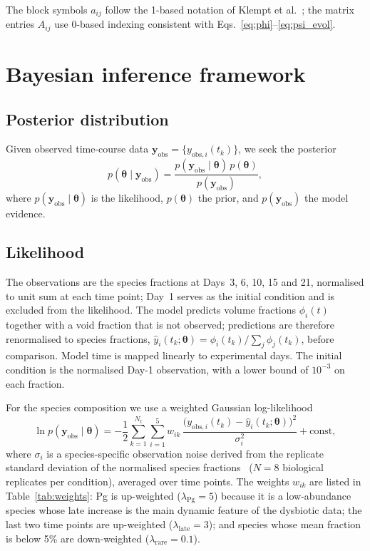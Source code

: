 \documentclass[pdflatex,sn-mathphys-num,lineno]{sn-jnl}
\newcommand{\btheta}{\boldsymbol{\theta}}
\newcommand{\yobs}{\mathbf{y}_{\mathrm{obs}}}
\begin{document}
The block symbols $a_{ij}$ follow the 1-based notation of Klempt et al.~\cite{Klempt2025ContinuumBiofilm}; the matrix entries $A_{ij}$ use 0-based indexing consistent with Eqs.~\eqref{eq:phi}--\eqref{eq:psi_evol}.

\section{Bayesian inference framework}
\label{sec:bayes}

\subsection{Posterior distribution}

Given observed time-course data $\yobs = \{y_{\mathrm{obs},i}(t_k)\}$, we seek the posterior
\begin{equation}
p(\btheta\mid\yobs)
= \frac{p(\yobs\mid\btheta)\,p(\btheta)}{p(\yobs)},
\label{eq:bayes}
\end{equation}
where $p(\yobs\mid\btheta)$ is the likelihood, $p(\btheta)$ the prior, and $p(\yobs)$ the model evidence.

\subsection{Likelihood}
\label{sec:likelihood}

The observations are the species fractions at Days~3, 6, 10, 15 and 21, normalised to unit sum at each time point; Day~1 serves as the initial condition and is excluded from the likelihood.
The model predicts volume fractions $\phi_i(t)$ together with a void fraction that is not observed; predictions are therefore renormalised to species fractions, $\hat{y}_i(t_k;\btheta)=\phi_i(t_k)\big/\sum_{j}\phi_j(t_k)$, before comparison.
Model time is mapped linearly to experimental days.
The initial condition is the normalised Day-1 observation, with a lower bound of $10^{-3}$ on each fraction.

For the species composition we use a weighted Gaussian log-likelihood
\begin{equation}
\ln p(\yobs\mid\btheta)
= -\frac12\sum_{k=1}^{N_t}\sum_{i=1}^{5} w_{ik}\,
\frac{\bigl(y_{\mathrm{obs},i}(t_k)-\hat{y}_i(t_k;\btheta)\bigr)^2}{\sigma_i^2} + \text{const},
\label{eq:likelihood}
\end{equation}
where $\sigma_{i}$ is a species-specific observation noise derived from the replicate standard deviation of the normalised species fractions~\cite{heine2025influence} ($N=8$ biological replicates per condition), averaged over time points.
The weights $w_{ik}$ are listed in Table~\ref{tab:weights}: Pg is up-weighted ($\lambda_{\mathrm{Pg}}=5$) because it is a low-abundance species whose late increase is the main dynamic feature of the dysbiotic data; the last two time points are up-weighted ($\lambda_{\mathrm{late}}=3$); and species whose mean fraction is below 5\% are down-weighted ($\lambda_{\mathrm{rare}}=0.1$).
\end{document}
